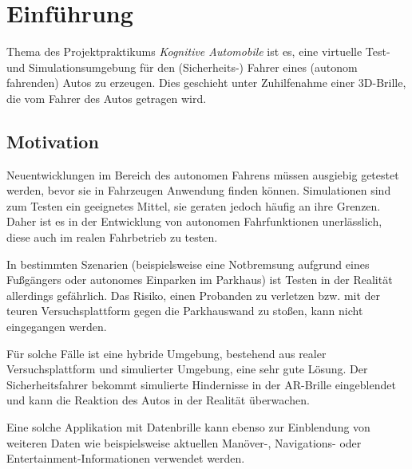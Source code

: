 
\section{Einführung}
\label{einleitung_sec}

Thema des Projektpraktikums \emph{Kognitive Automobile} ist es, eine virtuelle Test- und Simulationsumgebung für den (Sicherheits-) Fahrer eines (autonom fahrenden) Autos zu erzeugen.
Dies geschieht unter Zuhilfenahme einer 3D-Brille, die vom Fahrer des Autos getragen wird.



\subsection{Motivation}
\label{einleitung_motivation_subsec}


Neuentwicklungen im Bereich des autonomen Fahrens müssen ausgiebig getestet werden, bevor sie in  Fahrzeugen Anwendung finden können.
Simulationen sind zum Testen ein geeignetes Mittel, sie geraten jedoch häufig an ihre Grenzen.
Daher ist es in der Entwicklung von autonomen Fahrfunktionen unerlässlich, diese auch im realen Fahrbetrieb zu testen.

In bestimmten Szenarien (beispielsweise eine Notbremsung aufgrund eines Fußgängers oder autonomes Einparken im Parkhaus) ist Testen in der Realität allerdings gefährlich.
Das Risiko, einen Probanden zu verletzen bzw. mit der teuren Versuchsplattform gegen die Parkhauswand zu stoßen, kann nicht eingegangen werden.

Für solche Fälle ist eine hybride Umgebung, bestehend aus realer Versuchsplattform und simulierter Umgebung, eine sehr gute Lösung.
Der Sicherheitsfahrer bekommt simulierte Hindernisse in der AR-Brille eingeblendet und kann die Reaktion des Autos in der Realität überwachen.

Eine solche Applikation mit Datenbrille kann ebenso zur Einblendung von weiteren Daten wie beispielsweise aktuellen Manöver-, Navigations- oder Entertainment-Informationen verwendet werden.




